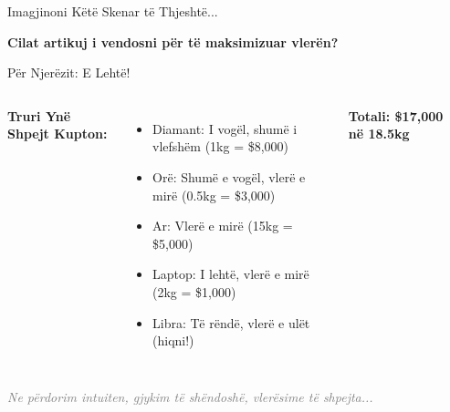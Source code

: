 \documentclass[aspectratio=169]{beamer}
\newcommand{\checkmark}{\ding{51}}
\newcommand{\xmark}{\ding{55}}
\begin{document}
\begin{frame}{Imagjinoni Këtë Skenar të Thjeshtë...}
\begin{center}
\end{center}

\vspace{0.5cm}
\begin{center}
\Large \textcolor{aiblue}{\textbf{Cilat artikuj i vendosni për të maksimizuar vlerën?}}
\end{center}
\end{frame}

\begin{frame}{Për Njerëzit: E Lehtë!}
\begin{columns}
\textbf{Truri Ynë Shpejt Kupton:}
\begin{itemize}
    \item \checkmark{} Diamant: I vogël, shumë i vlefshëm (1kg = \$8,000)
    \item \checkmark{} Orë: Shumë e vogël, vlerë e mirë (0.5kg = \$3,000)
    \item \checkmark{} Ar: Vlerë e mirë (15kg = \$5,000)
    \item \checkmark{} Laptop: I lehtë, vlerë e mirë (2kg = \$1,000)
    \item \xmark{} Libra: Të rëndë, vlerë e ulët (hiqni!)
\end{itemize}

\vspace{0.3cm}
\textcolor{aigreen}{\textbf{Totali: \$17,000 në 18.5kg}}

\begin{center}
\end{center}
\end{columns}

\vspace{0.5cm}
\begin{center}
\textcolor{gray}{\textit{Ne përdorim intuiten, gjykim të shëndoshë, vlerësime të shpejta...}}
\end{center}
\end{frame}
\end{document}

